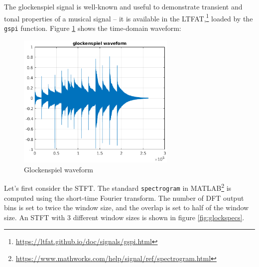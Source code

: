 \documentclass[letter,12pt]{article}
\begin{document}
The glockenspiel signal is well-known and useful to demonstrate transient and tonal properties of a musical signal -- it is available in the LTFAT,\footnote{\url{https://ltfat.github.io/doc/signals/gspi.html}} loaded by the \Verb#gspi# function. Figure \ref{fig:glockwaveform} shows the time-domain waveform:

\begin{figure}[ht]
	\centering
	\includegraphics[height=6.5cm]{./gspi_waveform.png}
	\caption{Glockenspiel waveform}
	\label{fig:glockwaveform}
\end{figure}

Let's first consider the STFT. The standard \Verb#spectrogram# in MATLAB\footnote{\url{https://www.mathworks.com/help/signal/ref/spectrogram.html}} is computed using the short-time Fourier transform. The number of DFT output bins is set to twice the window size, and the overlap is set to half of the window size. An STFT with 3 different window sizes is shown in figure \ref{fig:glockspecs}.
\end{document}
